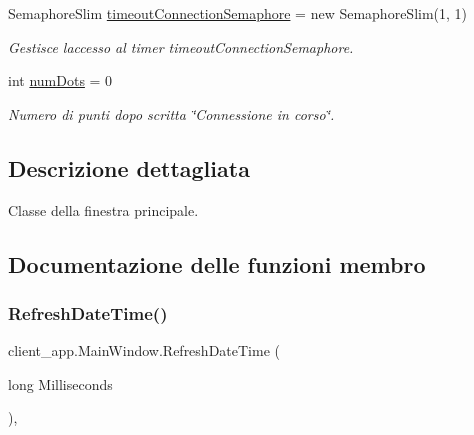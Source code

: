 \begin{DoxyCompactItemize}
\mbox{\label{classclient__app_1_1_main_window_aacba1479299c1ed873de496771f7905b}} 
Semaphore\+Slim \mbox{\hyperlink{classclient__app_1_1_main_window_aacba1479299c1ed873de496771f7905b}{timeout\+Connection\+Semaphore}} = new Semaphore\+Slim(1, 1)
\begin{DoxyCompactList}\small\item\em Gestisce l\textquotesingle{}accesso al timer timeout\+Connection\+Semaphore. \end{DoxyCompactList}\item 
\mbox{\label{classclient__app_1_1_main_window_ad0a147dfb37d39e6885d5bf1371f47fe}} 
int \mbox{\hyperlink{classclient__app_1_1_main_window_ad0a147dfb37d39e6885d5bf1371f47fe}{num\+Dots}} = 0
\begin{DoxyCompactList}\small\item\em Numero di punti dopo scritta \char`\"{}\+Connessione in corso\char`\"{}. \end{DoxyCompactList}\end{DoxyCompactItemize}


\subsection{Descrizione dettagliata}
Classe della finestra principale. 

\subsection{Documentazione delle funzioni membro}
\mbox{\label{classclient__app_1_1_main_window_aed5a74551edec2ad387d85b8b883597d}} 
\subsubsection{\texorpdfstring{RefreshDateTime()}{RefreshDateTime()}}
{\footnotesize\ttfamily client\+\_\+app.\+Main\+Window.\+Refresh\+Date\+Time (\begin{DoxyParamCaption}\item[{long}]{Milliseconds }\end{DoxyParamCaption})\hspace{0.3cm}{\ttfamily [inline]}, {\ttfamily [private]}}



